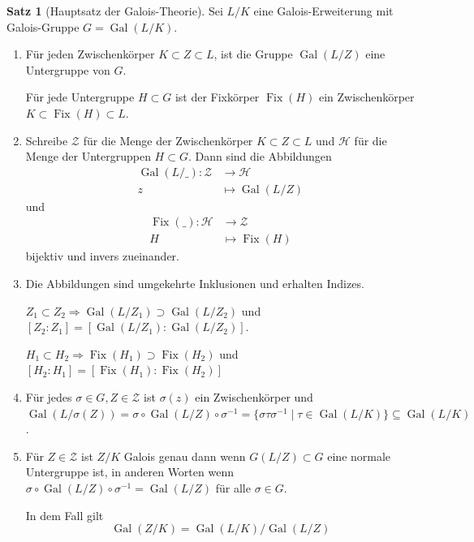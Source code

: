 \documentclass[12pt,parskip=full]{scrartcl}
\DeclareMathOperator{\Gal}{Gal}
\theoremstyle{definition}
\newtheorem{theorem}{Satz}[section]
\theoremstyle{remark}
\begin{document}
	\begin{theorem}[Hauptsatz der Galois-Theorie]
		Sei $L/K$ eine Galois-Erweiterung mit Galois-Gruppe $G = \Gal(L/K)$.
		\begin{enumerate}
			\item Für jeden Zwischenkörper $K \subset Z  \subset L$, ist die Gruppe $\Gal(L/Z)$ eine Untergruppe von $G$.
			
			Für jede Untergruppe $H \subset G$ ist der Fixkörper $\operatorname{Fix}(H)$ ein Zwischenkörper $K \subset \operatorname{Fix}(H) \subset L$.
			
			\item Schreibe $\mathcal{Z}$ für die Menge der Zwischenkörper $K \subset Z \subset L$ und $\mathcal{H}$ für die Menge der Untergruppen $H \subset G$. Dann sind die Abbildungen
			\begin{align*}
				\Gal(L/\_): \mathcal{Z} &\to \mathcal{H} \\
				z &\mapsto \Gal(L/Z)
			\end{align*}
			und
			\begin{align*}
				\operatorname{Fix}(\_): \mathcal{H} &\to \mathcal{Z} \\
				H &\mapsto \operatorname{Fix}(H)
			\end{align*}
			bijektiv und invers zueinander.
			
			\item Die Abbildungen sind umgekehrte Inklusionen und erhalten Indizes.
			
			$Z_1 \subset Z_2 \Rightarrow \Gal(L/Z_1) \supset \Gal(L/Z_2)$ und $[Z_2: Z_1] = [\Gal(L/Z_1):\Gal(L/Z_2)]$.
			
			$H_1 \subset H_2 \Rightarrow \operatorname{Fix}(H_1) \supset \operatorname{Fix}(H_2)$ und $[H_2:H_1] = [\operatorname{Fix}(H_1): \operatorname{Fix}(H_2)]$
			
			\item Für jedes $\sigma \in G, Z \in \mathcal{Z}$ ist $\sigma(z)$ ein Zwischenkörper und $\Gal(L/\sigma(Z)) = \sigma \circ \Gal(L/Z) \circ \sigma^{-1} = \{ \sigma \tau \sigma^{-1} \mid \tau \in \Gal(L/K) \} \subseteq \Gal(L/K)$.
			
			\item Für $Z \in \mathcal{Z}$ ist $Z/K$ Galois genau dann wenn $G(L/Z) \subset G$ eine normale Untergruppe ist, in anderen Worten wenn $\sigma \circ \Gal(L/Z) \circ \sigma^{-1} = \Gal(L/Z)$ für alle $\sigma \in G$.
			
			In dem Fall gilt
			\begin{equation*}
				\Gal(Z/K) = \Gal(L/K) / \Gal(L/Z)
			\end{equation*}
		\end{enumerate}
	\end{theorem}
\end{document}
